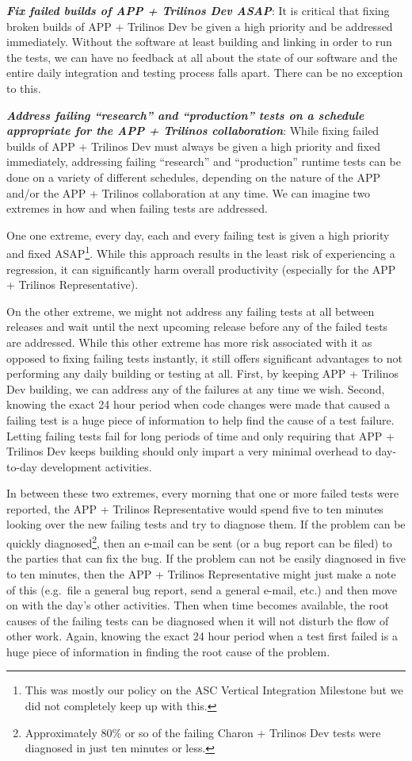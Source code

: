 \documentclass[pdf,ps2pdf,11pt]{SANDreport}
\begin{document}
{}\textit{\textbf{Fix failed builds of APP + Trilinos Dev ASAP}}: It is
critical that fixing broken builds of APP + Trilinos Dev be given a high
priority and be addressed immediately.  Without the software at least building
and linking in order to run the tests, we can have no feedback at all about
the state of our software and the entire daily integration and testing process
falls apart.  There can be no exception to this.

{}\textit{\textbf{Address failing ``research'' and ``production'' tests on a
schedule appropriate for the APP + Trilinos collaboration}}: While fixing
failed builds of APP + Trilinos Dev must always be given a high priority and
fixed immediately, addressing failing ``research'' and ``production'' runtime
tests can be done on a variety of different schedules, depending on the nature
of the APP and/or the APP + Trilinos collaboration at any time.  We can
imagine two extremes in how and when failing tests are addressed.

One one extreme, every day, each and every failing test is given a high
priority and fixed ASAP\footnote{This was mostly our policy on the ASC
Vertical Integration Milestone but we did not completely keep up with this.}.
While this approach results in the least risk of experiencing a regression, it
can significantly harm overall productivity (especially for the APP + Trilinos
Representative).

On the other extreme, we might not address any failing tests at all between
releases and wait until the next upcoming release before any of the failed
tests are addressed.  While this other extreme has more risk associated with
it as opposed to fixing failing tests instantly, it still offers significant
advantages to not performing any daily building or testing at all.  First, by
keeping APP + Trilinos Dev building, we can address any of the failures at any
time we wish.  Second, knowing the exact 24 hour period when code changes were
made that caused a failing test is a huge piece of information to help find
the cause of a test failure.  Letting failing tests fail for long periods of
time and only requiring that APP + Trilinos Dev keeps building should only
impart a very minimal overhead to day-to-day development activities.

In between these two extremes, every morning that one or more failed tests
were reported, the APP + Trilinos Representative would spend five to ten
minutes looking over the new failing tests and try to diagnose them.  If the
problem can be quickly diagnosed\footnote{Approximately 80\% or so of the
failing Charon + Trilinos Dev tests were diagnosed in just ten minutes or
less.}, then an e-mail can be sent (or a bug report can be filed) to the
parties that can fix the bug.  If the problem can not be easily diagnosed in
five to ten minutes, then the APP + Trilinos Representative might just make a
note of this (e.g.\ file a general bug report, send a general e-mail, etc.) 
and then move on with the day's other activities.  Then when time becomes
available, the root causes of the failing tests can be diagnosed when it will
not disturb the flow of other work.  Again, knowing the exact 24 hour period
when a test first failed is a huge piece of information in finding the root
cause of the problem.
\end{document}

